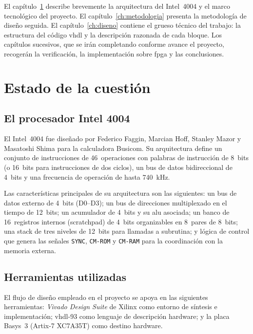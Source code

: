 \documentclass[%
    school=etsisi,%
    type=pfg,%
    degree=61CI,%
]{upm-report}
\begin{document}

El capítulo~\ref{ch:estado-cuestion} describe brevemente la arquitectura del
Intel~4004 y el marco tecnológico del proyecto.  El
capítulo~\ref{ch:metodologia} presenta la metodología de diseño seguida.
El capítulo~\ref{ch:diseno} contiene el grueso técnico del trabajo: la
estructura del código \acrshort{vhdl} y la descripción razonada de cada
bloque.  Los capítulos sucesivos, que se irán completando conforme avance el
proyecto, recogerán la verificación, la implementación sobre \acrshort{fpga}
y las conclusiones.

\chapter{Estado de la cuestión}
\label{ch:estado-cuestion}


\section{El procesador Intel 4004}

El Intel~4004 fue diseñado por Federico Faggin, Marcian Hoff, Stanley Mazor
y Masatoshi Shima para la calculadora Busicom.  Su arquitectura define un
conjunto de instrucciones de 46~operaciones con palabras de instrucción de
8~bits (o 16~bits para instrucciones de dos ciclos), un bus de datos
bidireccional de 4~bits y una frecuencia de operación de hasta 740~kHz.

Las características principales de su arquitectura son las siguientes:
un bus de datos externo de 4~bits (D0--D3); un bus de direcciones multiplexado
en el tiempo de 12~bits; un acumulador de 4~bits y su \acrshort{alu} asociada;
un banco de 16~registros internos (\gls{scratchpad}) de 4~bits organizables
en 8~pares de 8~bits; una \gls{stack} de tres niveles de 12~bits para llamadas
a subrutina; y lógica de control que genera las señales \texttt{SYNC},
\texttt{CM-ROM} y \texttt{CM-RAM} para la coordinación con la memoria externa.

\section{Herramientas utilizadas}

El flujo de diseño empleado en el proyecto se apoya en las siguientes
herramientas: \textit{Vivado Design Suite} de Xilinx como entorno de síntesis
e implementación; \acrshort{vhdl}-93 como lenguaje de descripción hardware; y
la placa Basys~3 (Artix-7 XC7A35T) como destino hardware.
\end{document}
